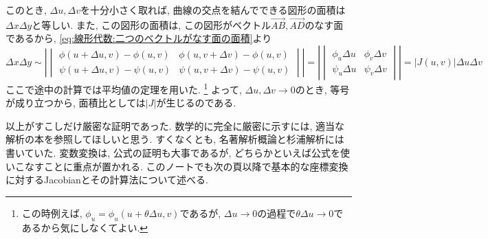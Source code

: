         このとき, $\Delta u,\Delta v$を十分小さく取れば, 曲線の交点を結んでできる図形の面積は$\Delta x\Delta y$と等しい.
        また, この図形の面積は, この図形がベクトル$\vec{AB},\vec{AD}$のなす面であるから, \eqref{eq:線形代数:二つのベクトルがなす面の面積}より
        \begin{equation*}
            \Delta x\Delta y\sim\left|\begin{vmatrix}\phi(u+\Delta u,v)-\phi(u,v) & \phi(u,v+\Delta v)-\phi(u,v) \\ \psi(u+\Delta u,v)-\psi(u,v) & \psi(u,v+\Delta v)-\psi(u,v)\end{vmatrix}\right|=\left|\begin{vmatrix}\phi_u\Delta u & \phi_v\Delta v \\ \psi_u\Delta u & \psi_v\Delta v\end{vmatrix}\right|=|J(u,v)|\Delta u\Delta v
        \end{equation*}
        ここで途中の計算では平均値の定理を用いた. \footnote{この時例えば, $\phi_u=\phi_u(u+\theta\Delta u,v)$であるが, $\Delta u\to 0$の過程で$\theta\Delta u\to 0$であるから気にしなくてよい.}
        よって, $\Delta u,\Delta v \to 0$のとき, 等号が成り立つから, 面積比としては$|J|$が生じるのである.

        以上がすこしだけ厳密な証明であった. 数学的に完全に厳密に示すには, 適当な解析の本を参照してほしいと思う. すくなくとも, 名著解析概論と杉浦解析には書いていた.
        変数変換は, 公式の証明も大事であるが, どちらかといえば公式を使いこなすことに重点が置かれる. このノートでも次の頁以降で基本的な座標変換に対するJacobianとその計算法について述べる.

